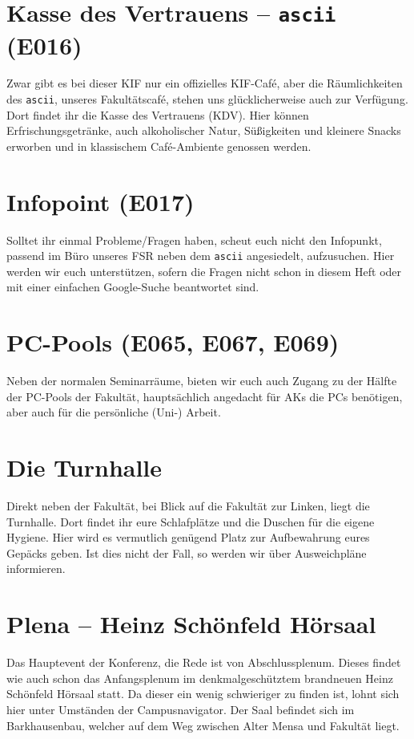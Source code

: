 \section*{Kasse des Vertrauens – \texttt{ascii} (E016)}
Zwar gibt es bei dieser KIF nur ein offizielles KIF-Café, aber die Räumlichkeiten des \texttt{ascii}, unseres Fakultätscafé, stehen uns glücklicherweise auch zur Verfügung.
Dort findet ihr die Kasse des Vertrauens (KDV).
Hier können Erfrischungsgetränke, auch alkoholischer Natur, Süßigkeiten und kleinere Snacks erworben und in klassischem Café-Ambiente genossen werden.

\section*{Infopoint (E017)}
Solltet ihr einmal Probleme/Fragen haben, scheut euch nicht den Infopunkt, passend im Büro unseres FSR neben dem \texttt{ascii} angesiedelt, aufzusuchen.
Hier werden wir euch unterstützen, sofern die Fragen nicht schon in diesem Heft oder mit einer einfachen Google-Suche beantwortet sind.

\section*{PC-Pools (E065, E067, E069)}
Neben der normalen Seminarräume, bieten wir euch auch Zugang zu der Hälfte der PC-Pools der Fakultät, hauptsächlich angedacht für AKs die PCs benötigen, aber auch für die persönliche (Uni-) Arbeit.

\section*{Die Turnhalle}
Direkt neben der Fakultät, bei Blick auf die Fakultät zur Linken, liegt die Turnhalle.
Dort findet ihr eure Schlafplätze und die Duschen für die eigene Hygiene.
Hier wird es vermutlich genügend Platz zur Aufbewahrung eures Gepäcks geben.
Ist dies nicht der Fall, so werden wir über Ausweichpläne informieren.

\section*{Plena -- Heinz Schönfeld Hörsaal}
Das Hauptevent der Konferenz, die Rede ist von Abschlussplenum.
Dieses findet wie auch schon das Anfangsplenum im denkmalgeschütztem brandneuen Heinz Schönfeld Hörsaal statt.
Da dieser ein wenig schwieriger zu finden ist, lohnt sich hier unter Umständen der Campusnavigator.
Der Saal befindet sich im Barkhausenbau, welcher auf dem Weg zwischen Alter Mensa und Fakultät liegt.

